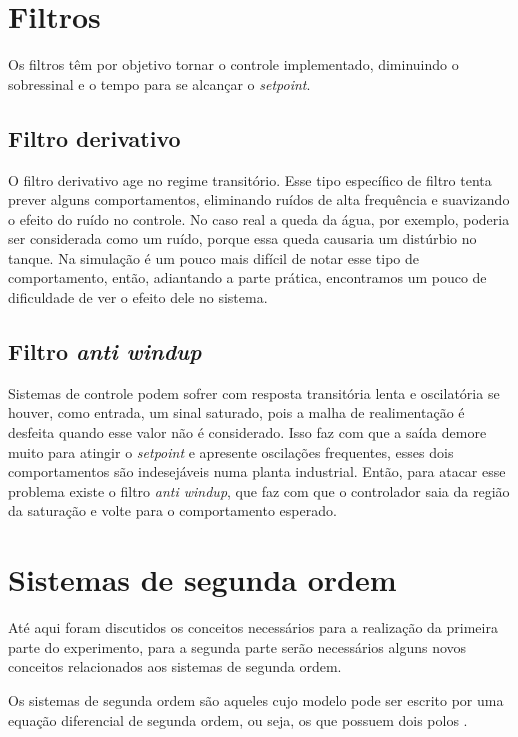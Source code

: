 \documentclass[
	12pt,				%
	openany,			%
	oneside,			%
	a4paper,			%
	english,			%
	french,				%
	spanish,			%
	brazil,				%
	]{abntex2}
\begin{document}
{\section{Filtros}

Os filtros têm por objetivo tornar o controle implementado, diminuindo o sobressinal e o tempo para se alcançar o \textit{setpoint}.

\subsection{Filtro derivativo}

O filtro derivativo age no regime transitório. Esse tipo específico de filtro tenta prever alguns comportamentos, eliminando ruídos de alta frequência e suavizando o efeito do ruído no controle. No caso real a queda da água, por exemplo, poderia ser considerada como um ruído, porque essa queda causaria um distúrbio no tanque. Na simulação é um pouco mais difícil de notar esse tipo de comportamento, então, adiantando a parte prática, encontramos um pouco de dificuldade de ver o efeito dele no sistema.

\subsection{Filtro \textit{anti windup}}

Sistemas de controle podem sofrer com resposta transitória lenta e oscilatória se houver, como entrada, um sinal saturado, pois a malha de realimentação é desfeita quando esse valor não é considerado. Isso faz com que a saída demore muito para atingir o \textit{setpoint} e apresente oscilações frequentes, esses dois comportamentos são indesejáveis numa planta industrial. Então, para atacar esse problema existe o filtro \textit{anti windup}, que faz com que o controlador saia da região da saturação e volte para o comportamento esperado.

\section{Sistemas de segunda ordem}

Até aqui foram discutidos os conceitos necessários para a realização da primeira parte do experimento, para a segunda parte serão necessários alguns novos conceitos relacionados aos sistemas de segunda ordem. 

Os sistemas de segunda ordem são aqueles cujo modelo pode ser escrito por uma equação diferencial de segunda ordem, ou seja, os que possuem dois polos \cite{dan_madeira}.

}
\end{document}
